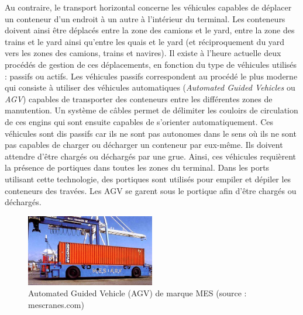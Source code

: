 Au contraire, le transport horizontal concerne les véhicules capables de déplacer un conteneur d'un endroit à un autre à l'intérieur du terminal. Les conteneurs doivent ainsi être déplacés entre la zone des camions et le yard, entre la zone des trains et le yard ainsi qu'entre les quais et le yard (et réciproquement du yard vers les zones des camions, trains et navires).
Il existe à l'heure actuelle deux procédés de gestion de ces déplacements, en fonction du type de véhicules utilisés : passifs ou actifs.
Les véhicules passifs correspondent au procédé le plus moderne qui consiste à utiliser des véhicules automatiques (\textit{Automated Guided Vehicles} ou \textit{AGV}) capables de transporter des conteneurs entre les différentes zones de manutention. Un système de câbles permet de délimiter les couloirs de circulation de ces engins qui sont ensuite capables de s'orienter automatiquement. Ces véhicules sont dis passifs car ils ne sont pas autonomes dans le sens où ils ne sont pas capables de charger ou décharger un conteneur par eux-même. Ils doivent attendre d'être chargés ou déchargés par une grue. Ainsi, ces véhicules requièrent la présence de portiques dans toutes les zones du terminal. Dans les ports utilisant cette technologie, des portiques sont utilisés pour empiler et dépiler les conteneurs des travées. Les AGV se garent sous le portique afin d'être chargés ou déchargés.

\begin{figure}[ht]
 \label{fig:AGV}
 \begin{center}
 \includegraphics[width=0.5\textwidth]{chapitres/application/agv.png}
 \caption{Automated Guided Vehicle (AGV) de marque MES (source : mescranes.com)}
 \end{center}
\end{figure}


